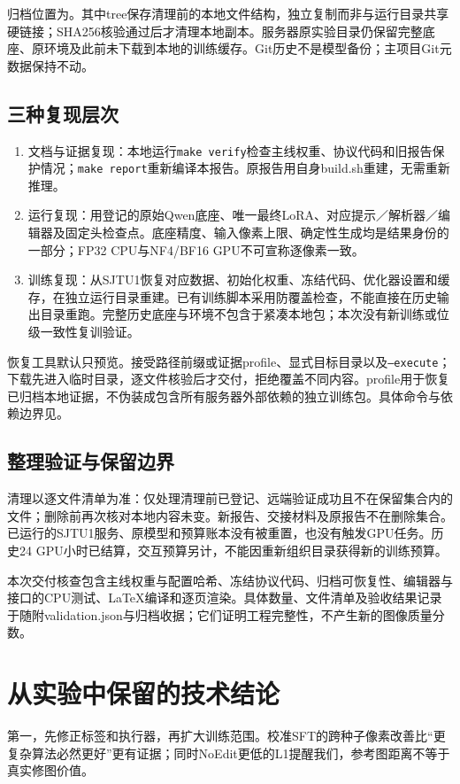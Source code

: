 \documentclass[UTF8,fontset=none,zihao=5,a4paper]{ctexart}
\newcommand{\code}[1]{\texttt{#1}}
\begin{document}
归档位置为。其中tree保存清理前的本地文件结构，独立复制而非与运行目录共享硬链接；SHA256核验通过后才清理本地副本。服务器原实验目录仍保留完整底座、原环境及此前未下载到本地的训练缓存。Git历史不是模型备份；主项目Git元数据保持不动。

\subsection{三种复现层次}
\begin{enumerate}
\item 文档与证据复现：本地运行\code{make verify}检查主线权重、协议代码和旧报告保护情况；\code{make report}重新编译本报告。原报告用自身build.sh重建，无需重新推理。
\item 运行复现：用登记的原始Qwen底座、唯一最终LoRA、对应提示／解析器／编辑器及固定头检查点。底座精度、输入像素上限、确定性生成均是结果身份的一部分；FP32 CPU与NF4/BF16 GPU不可宣称逐像素一致。
\item 训练复现：从SJTU1恢复对应数据、初始化权重、冻结代码、优化器设置和缓存，在独立运行目录重建。已有训练脚本采用防覆盖检查，不能直接在历史输出目录重跑。完整历史底座与环境不包含于紧凑本地包；本次没有新训练或位级一致性复训验证。
\end{enumerate}

恢复工具默认只预览。接受路径前缀或证据profile、显式目标目录以及\code{--execute}；下载先进入临时目录，逐文件核验后才交付，拒绝覆盖不同内容。profile用于恢复已归档本地证据，不伪装成包含所有服务器外部依赖的独立训练包。具体命令与依赖边界见。

\subsection{整理验证与保留边界}
清理以逐文件清单为准：仅处理清理前已登记、远端验证成功且不在保留集合内的文件；删除前再次核对本地内容未变。新报告、交接材料及原报告不在删除集合。已运行的SJTU1服务、原模型和预算账本没有被重置，也没有触发GPU任务。历史24 GPU小时已结算，交互预算另计，不能因重新组织目录获得新的训练预算。

本次交付核查包含主线权重与配置哈希、冻结协议代码、归档可恢复性、编辑器与接口的CPU测试、LaTeX编译和逐页渲染。具体数量、文件清单及验收结果记录于随附validation.json与归档收据；它们证明工程完整性，不产生新的图像质量分数。

\section{从实验中保留的技术结论}
第一，先修正标签和执行器，再扩大训练范围。校准SFT的跨种子像素改善比“更复杂算法必然更好”更有证据；同时NoEdit更低的L1提醒我们，参考图距离不等于真实修图价值。
\end{document}
